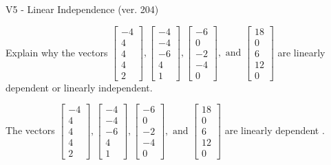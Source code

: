 \begin{exercise}
  \begin{exerciseTitle}V5 - Linear Independence (ver. 204)\end{exerciseTitle}
  \begin{exerciseStatement}
    Explain why the vectors \(\left[\begin{array}{r}
-4 \\
4 \\
4 \\
4 \\
2
\end{array}\right] , \left[\begin{array}{r}
-4 \\
-4 \\
-6 \\
4 \\
1
\end{array}\right] , \left[\begin{array}{r}
-6 \\
0 \\
-2 \\
-4 \\
0
\end{array}\right] , \text{ and } \left[\begin{array}{r}
18 \\
0 \\
6 \\
12 \\
0
\end{array}\right]\) are linearly dependent or linearly independent.	


  \end{exerciseStatement}
  \begin{exerciseAnswer}
   The vectors \(\left[\begin{array}{r}
-4 \\
4 \\
4 \\
4 \\
2
\end{array}\right] , \left[\begin{array}{r}
-4 \\
-4 \\
-6 \\
4 \\
1
\end{array}\right] , \left[\begin{array}{r}
-6 \\
0 \\
-2 \\
-4 \\
0
\end{array}\right] , \text{ and } \left[\begin{array}{r}
18 \\
0 \\
6 \\
12 \\
0
\end{array}\right]\) are 
  	 linearly dependent  .
  


  \end{exerciseAnswer}
\end{exercise}